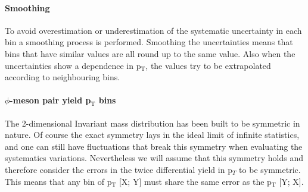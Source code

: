\paragraph{Smoothing}
To avoid overestimation or underestimation of the systematic uncertainty in each bin a smoothing process is performed. Smoothing the uncertainties means that bins that have similar values are all round up to the same value. Also when the uncertainties show a dependence in p$_{\text{T}}$, the values try to be extrapolated according to neighbouring bins.

\paragraph{$\phi$-meson pair yield p$_{\text{T}}$ bins}
The 2-dimensional Invariant mass distribution has been built to be symmetric in nature. Of course the exact symmetry lays in the ideal limit of infinite statistics, and one can still have fluctuations that break this symmetry when evaluating the systematics variations. Nevertheless we will assume that this symmetry holds and therefore consider the errors in the twice differential yield in p$_{T}$ to be symmetric. This means that any bin of p$_{\text{T}}$ [X; Y] must share the same error as the p$_{\text{T}}$ [Y; X].

